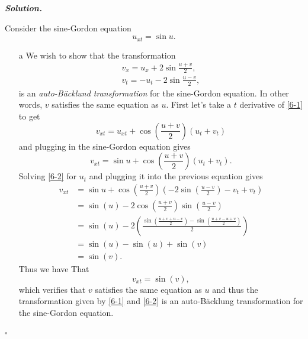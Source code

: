 \documentclass[12pt]{report}
\newenvironment{solution}[1][\it{Solution}]{\textbf{#1. } }{$\square$}
\newcommand{\paren}[1]{{\left(#1\right)}} %
\begin{document}
\begin{solution}
    
    \noindent
    Consider the sine-Gordon equation
    \[
        u_{xt}=\sin u.
    \]
    \begin{enumerate}
        \item [a]
        We wish to show that the transformation
        \begin{align}
            v_x=u_x+2\sin \frac{u+v}{2}, \label{6-1}\\
            v_t=-u_t-2\sin \frac{u-v}{2}, \label{6-2}
        \end{align}
        is an {\em auto-B\"acklund transformation} for the sine-Gordon equation. In other words, $v$ satisfies the same equation as $u$. First let's take a $t$ derivative of \ref{6-1} to get
        \[
            v_{xt} = u_{xt} + \cos\paren{\frac{u+v}{2}}(u_t + v_t)
        \]
        and plugging in the sine-Gordon equation gives
        \[
            v_{xt} = \sin u + \cos\paren{\frac{u+v}{2}}(u_t + v_t).
        \]
        Solving \ref{6-2} for $u_t$ and plugging it into the previous equation gives
        \begin{align*}
            v_{xt} &= \sin u + \cos\paren{\frac{u+v}{2}}(-2\sin\paren{\frac{u-v}{2}} - v_t + v_t)\\ 
            &= \sin(u) - 2\cos\paren{\frac{u+v}{2}}\sin\paren{\frac{u-v}{2}}\\
            &= \sin(u)-2\paren{\frac{\sin\paren{\frac{u+v+u-v}{2}}-\sin\paren{\frac{u+v-u+v}{2}}}{2}}\\
            &= \sin(u) - \sin(u) + \sin(v)\\
            &=\sin(v).
        \end{align*}
        Thus we have That
        \[v_{xt} = \sin(v),\]
        which verifies that $v$ satisfies the same equation as $u$ and thus the transformation given by \ref{6-1} and \ref{6-2} is an auto-B\"acklung transformation for the sine-Gordon equation.


\end{enumerate}
\end{solution}
\end{document}
